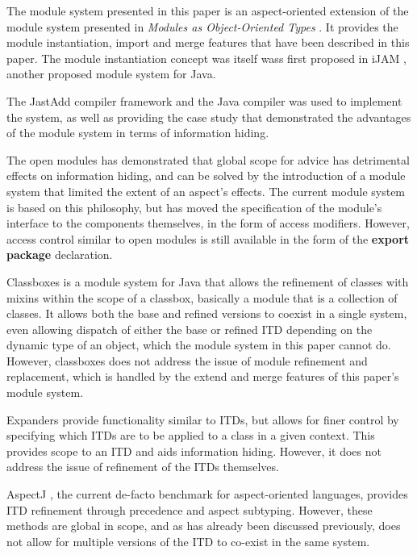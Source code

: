 The module system presented in this paper is an aspect-oriented extension of the module
system presented in \textit{Modules as Object-Oriented Types} \cite{modulesastypes}. It
provides the module instantiation, import and merge features that have been described in
this paper. The module instantiation concept was itself wass first proposed in iJAM \cite{iJAM}, 
another proposed module system for Java.

The JastAdd compiler framework and the Java compiler \cite{jastadd, jastaddjavacompiler}
was used to implement the system, as well as providing the case study that demonstrated 
the advantages of the module system in terms of information hiding.

The open modules \cite{openmodules, openmodulesaj} has demonstrated that global scope for advice
has detrimental effects on information hiding, and can be solved by
the introduction of a module system that limited the extent of an aspect's effects. The
current module system is based on this philosophy, but has moved the specification of
the module's interface to the components themselves, in the form of access modifiers.
However, access control similar to open modules is still available in the form of the
\textbf{export package} declaration.

Classboxes \cite{classboxj} is a module system for Java that allows the refinement of classes
with mixins within the scope of a classbox, basically a module that is a collection of classes. 
It allows both the base and refined versions to coexist in a single system, even allowing
dispatch of either the base or refined ITD depending on the dynamic type of an object, which
the module system in this paper cannot do. However, classboxes does not address the issue of
module refinement and replacement, which is handled by the extend and merge features of
this paper's module system.

Expanders \cite{expanders} provide functionality similar to ITDs, but allows for finer control
by specifying which ITDs are to be applied to a class in a given context. This provides scope
to an ITD and aids information hiding. However, it does not address the issue of refinement of 
the ITDs themselves.

AspectJ \cite{overviewaspectj}, the current de-facto benchmark for aspect-oriented languages, 
provides ITD refinement through precedence and aspect subtyping. However, these methods are
global in scope, and as has already been discussed previously, does not allow for multiple
versions of the ITD to co-exist in the same system.

